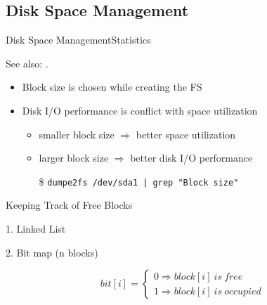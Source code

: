 \subsection{Disk Space Management}

\begin{frame}{Disk Space Management}{Statistics}
  \centering
  \mode<beamer>{ \texttt{[image: blksz]} }%
\end{frame}

See also: .

\begin{frame}%
  \begin{itemize}
  \item Block size is chosen while creating the FS
  \item Disk I/O performance is conflict with space utilization
    \begin{itemize}
    \item smaller block size $\Rightarrow{}$ better space utilization
    \item larger block size $\Rightarrow{}$ better disk I/O performance
    \end{itemize}
    \begin{itemize}
    \item[\$] \texttt{dumpe2fs /dev/sda1 | grep "Block size"}
    \end{itemize}
  \end{itemize}
\end{frame}

\begin{frame}{Keeping Track of Free Blocks}
  \begin{minipage}{.4\textwidth}
    \alert{1.} Linked List
    \begin{center}
    \end{center}
  \end{minipage}\hfill
  \begin{minipage}{.5\textwidth}
    \alert{2.} Bit map (n blocks)
    \begin{center}
    \end{center}
    \begin{equation*}
      bit[i]=
      \begin{cases}
        0\Rightarrow{}block[i]\ is\ free\\
        1\Rightarrow{}block[i]\ is\ occupied
      \end{cases}
    \end{equation*}
  \end{minipage}
\end{frame}

